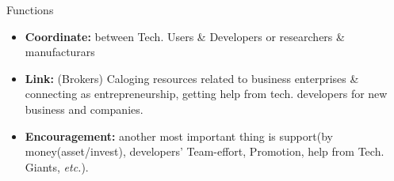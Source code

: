\begin{frame}{Functions}
\begin{itemize}
	\item \textbf{Coordinate:} between Tech. Users \& Developers or researchers \& manufacturars
	\item \textbf{Link:} (Brokers) Caloging resources related to business enterprises \& connecting as entrepreneurship, getting help from tech. developers for new business and companies.
	\item \textbf{Encouragement:} another most important thing is support(by money(asset/invest), developers' Team-effort, Promotion, help from Tech. Giants, \textit{etc.}).
\end{itemize}
\end{frame}
